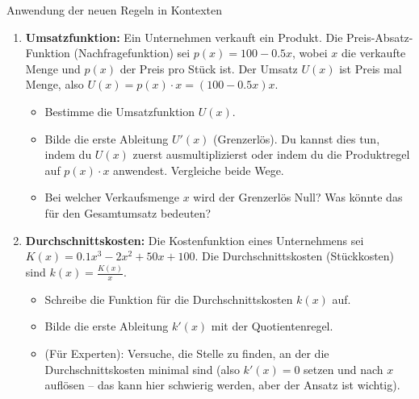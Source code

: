 \begin{aufgabenumgebung}{Anwendung der neuen Regeln in Kontexten}
\begin{enumerate}
    \item \textbf{Umsatzfunktion:} Ein Unternehmen verkauft ein Produkt. Die Preis-Absatz-Funktion (Nachfragefunktion) sei $p(x) = 100 - 0.5x$, wobei $x$ die verkaufte Menge und $p(x)$ der Preis pro Stück ist. Der Umsatz $U(x)$ ist Preis mal Menge, also $U(x) = p(x) \cdot x = (100-0.5x)x$.
        \begin{itemize}
            \item Bestimme die Umsatzfunktion $U(x)$.
            \item Bilde die erste Ableitung $U'(x)$ (Grenzerlös). Du kannst dies tun, indem du $U(x)$ zuerst ausmultiplizierst oder indem du die Produktregel auf $p(x) \cdot x$ anwendest. Vergleiche beide Wege.
            \item Bei welcher Verkaufsmenge $x$ wird der Grenzerlös Null? Was könnte das für den Gesamtumsatz bedeuten?
        \end{itemize}
    \item \textbf{Durchschnittskosten:} Die Kostenfunktion eines Unternehmens sei $K(x) = 0.1x^3 - 2x^2 + 50x + 100$. Die Durchschnittskosten (Stückkosten) sind $k(x) = \frac{K(x)}{x}$.
        \begin{itemize}
            \item Schreibe die Funktion für die Durchschnittskosten $k(x)$ auf.
            \item Bilde die erste Ableitung $k'(x)$ mit der Quotientenregel.
            \item (Für Experten): Versuche, die Stelle zu finden, an der die Durchschnittskosten minimal sind (also $k'(x)=0$ setzen und nach $x$ auflösen – das kann hier schwierig werden, aber der Ansatz ist wichtig).
        \end{itemize}
\end{enumerate}
\end{aufgabenumgebung}




